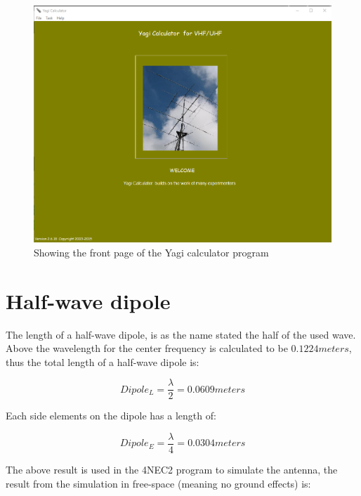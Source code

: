 \begin{figure}[h!]
\centering
\includegraphics[scale=0.5]{figures/YagiCalculator.PNG}
\caption{Showing the front page of the Yagi calculator program}
\end{figure}

\newpage

\section{Half-wave dipole}
The length of a half-wave dipole, is as the name stated the half of the used wave. Above the wavelength for the center frequency is calculated to be $0.1224meters$, thus the total length of a half-wave dipole is:

\begin{equation}
  Dipole_L = \frac{\lambda}{2} = 0.0609 meters
\end{equation}

Each side elements on the dipole has a length of:

\begin{equation}
  Dipole_E = \frac{\lambda}{4} = 0.0304 meters
\end{equation}

The above result is used in the 4NEC2 program to simulate the antenna, the result from the simulation in free-space (meaning no ground effects) is: 

